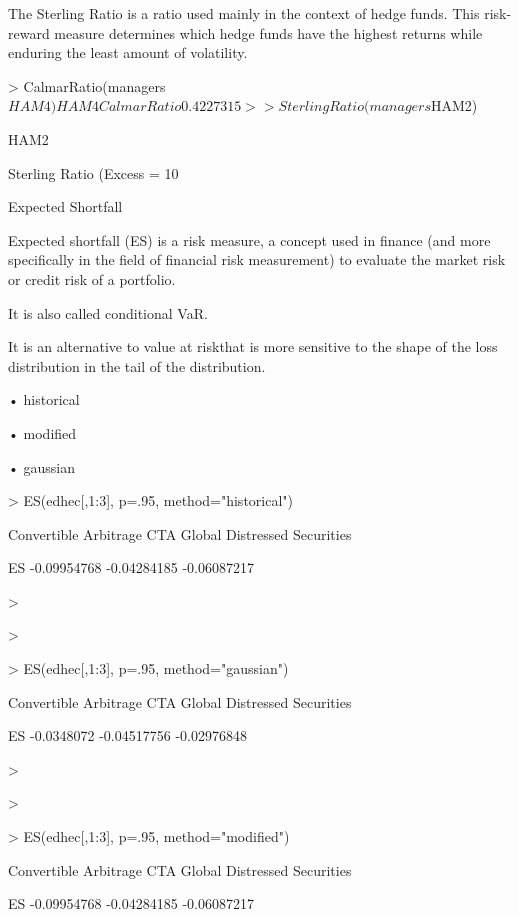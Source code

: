 The Sterling Ratio is a ratio used mainly in the context of hedge funds. This risk-reward measure determines which hedge funds have the highest returns while enduring the least amount of volatility.









> CalmarRatio(managers$HAM4)

                  HAM4

Calmar Ratio 0.4227315

>

> SterlingRatio(managers$HAM2)

                                  HAM2

Sterling Ratio (Excess = 10%
 





Expected Shortfall


Expected shortfall (ES) is a risk measure, a concept used in finance (and more specifically in the field of financial risk measurement) to evaluate the market risk or credit risk of a portfolio. 


It is also called conditional VaR.


It is an alternative to value at riskthat is more sensitive to the shape of the loss distribution in the tail of the distribution. 

•
historical

•
modified

•
gaussian










> ES(edhec[,1:3], p=.95, method="historical")

   

    Convertible Arbitrage  CTA Global       Distressed Securities

ES  -0.09954768            -0.04284185      -0.06087217

> 

>

> ES(edhec[,1:3], p=.95, method="gaussian")


     Convertible Arbitrage  CTA Global      Distressed Securities

ES   -0.0348072             -0.04517756     -0.02976848

>

>

> ES(edhec[,1:3], p=.95, method="modified")


     Convertible Arbitrage  CTA Global      Distressed Securities

ES   -0.09954768            -0.04284185     -0.06087217
 


